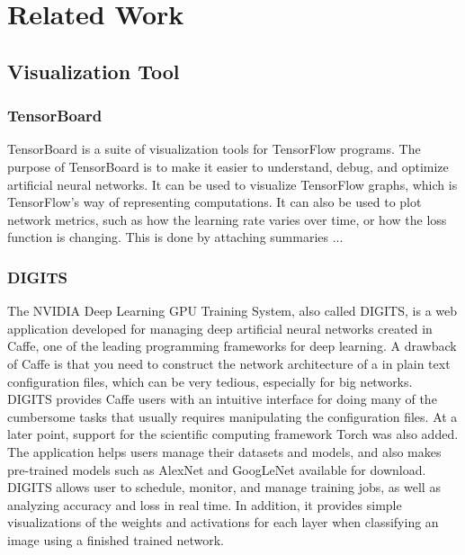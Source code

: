 
\chapter{Related Work}

\section{Visualization Tool}


\subsection{TensorBoard}

TensorBoard is a suite of visualization tools for TensorFlow programs. The purpose of TensorBoard is to make it easier to understand, debug, and optimize artificial neural networks. It can be used to visualize TensorFlow graphs, which is TensorFlow's way of representing computations. It can also be used to plot network metrics, such as how the learning rate varies over time, or how the loss function is changing. This is done by attaching summaries ...

\subsection{DIGITS}

The NVIDIA Deep Learning GPU Training System, also called DIGITS, is a web application developed for managing deep artificial neural networks created in Caffe, one of the leading programming frameworks for deep learning. A drawback of Caffe is that you need to construct the network architecture of a in plain text configuration files, which can be very tedious, especially for big networks. DIGITS provides Caffe users with an intuitive interface for doing many of the cumbersome tasks that usually requires manipulating the configuration files. At a later point, support for the scientific computing framework Torch was also added. The application helps users manage their datasets and models, and also makes pre-trained models such as AlexNet and GoogLeNet available for download. DIGITS allows user to schedule, monitor, and manage training jobs, as well as analyzing accuracy and loss in real time. In addition, it provides simple visualizations of the weights and activations for each layer when classifying an image using a finished trained network. \\

